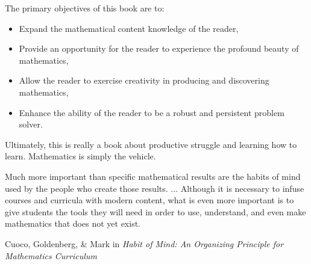The primary objectives of this book are to:
\begin{itemize}
\item Expand the mathematical content knowledge of the reader,
\item Provide an opportunity for the reader to experience the profound beauty of mathematics,
\item Allow the reader to exercise creativity in producing and discovering mathematics,
\item Enhance the ability of the reader to be a robust and persistent problem solver.
\end{itemize}
Ultimately, this is really a book about productive struggle and learning how to learn. Mathematics is simply the vehicle.

\epigraph{Much more important than specific mathematical results are the habits of mind used by the people who create those results. ... Although it is necessary to infuse courses and curricula with modern content, what is even more important is to give students the tools they will need in order to use, understand, and even make mathematics that does not yet exist.}{Cuoco, Goldenberg, \& Mark in \emph{Habit of Mind: An Organizing Principle for Mathematics Curriculum}}
